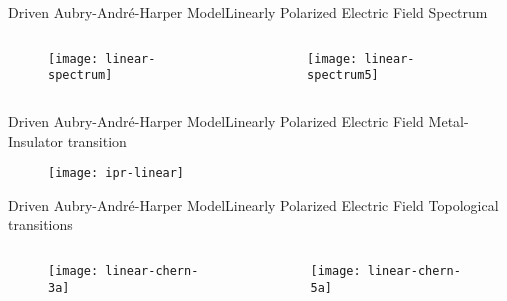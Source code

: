 \documentclass{beamer}
\begin{document}
\begin{frame}{Driven Aubry-Andr\'e-Harper Model}{Linearly Polarized Electric Field}
\alert{Spectrum}
 \begin{columns}
  \begin{column}{0.5\textwidth}
   \begin{figure}[h]
 \centering
 \texttt{[image: linear-spectrum]}
\end{figure}
  \end{column}
  \begin{column}{0.5\textwidth}
      \begin{figure}[h]
 \centering
 \texttt{[image: linear-spectrum5]}
\end{figure}
  \end{column}
 \end{columns}
\end{frame}

\begin{frame}{Driven Aubry-Andr\'e-Harper Model}{Linearly Polarized Electric Field}
 \alert{Metal-Insulator transition}
 \begin{figure}[h]
  \centering
  \texttt{[image: ipr-linear]}
 \end{figure}
\end{frame}

\begin{frame}{Driven Aubry-Andr\'e-Harper Model}{Linearly Polarized Electric Field}
\alert{Topological transitions}
 \begin{columns}
  \begin{column}{0.5\textwidth}
   \begin{figure}[h]
 \centering
 \texttt{[image: linear-chern-3a]}
\end{figure}
  \end{column}
  \begin{column}{0.5\textwidth}
      \begin{figure}[h]
 \centering
 \texttt{[image: linear-chern-5a]}
\end{figure}
  \end{column}
 \end{columns}
\end{frame}
\end{document}
